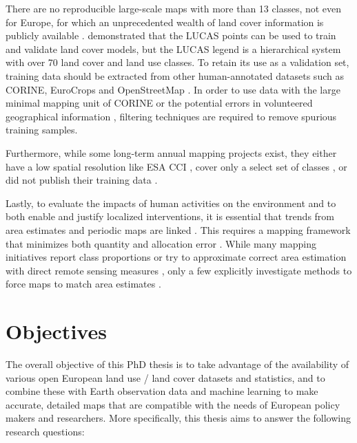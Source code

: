     There are no reproducible large-scale maps with more than 13 classes, not even for Europe, for which an unprecedented wealth of land cover information is publicly available \citep{dandrimont2020harmonised}. \citet{pflugmacher2019mapping} demonstrated that the LUCAS points can be used to train and validate land cover models, but the LUCAS legend is a hierarchical system with over 70 land cover and land use classes. To retain its use as a validation set, training data should be extracted from other human-annotated datasets such as CORINE, EuroCrops \citep{schneider2023eurocrops} and OpenStreetMap \citep{schultz2017open}.  In order to use data with the large minimal mapping unit of CORINE or the potential errors in volunteered geographical information \citep{neis2014recent}, filtering techniques are required to remove spurious training samples.

    Furthermore, while some long-term annual mapping projects exist, they either have a low spatial resolution like ESA CCI \citep{harper202229}, cover only a select set of classes \citep{potapov2022global}, or did not publish their training data \citep{zhang2020glcfcs30}. 

    Lastly, to evaluate the impacts of human activities on the environment and to both enable and justify localized interventions, it is essential that trends from area estimates and periodic maps are linked \citep{olofsson2014good,szantoi2020addressing,winkler2021global}. This requires a mapping framework that minimizes both quantity and allocation error \citep{pontius2011death}. While many mapping initiatives report class proportions \citep{pflugmacher2019mapping} or try to approximate correct area estimation with direct remote sensing measures \citep{kleinewillinghofer2022unbiased}, only a few explicitly investigate methods to force maps to match area estimates \citep{strahler1980use,horvath2021comparison}.
    

\section{Objectives}
\label{sec:research_objectives}
The overall objective of this PhD thesis is to take advantage of the availability of various open European land use / land cover datasets and statistics, and to combine these with Earth observation data and machine learning to make accurate, detailed maps that are compatible with the needs of European policy makers and researchers. More specifically, this thesis aims to answer the following research questions:

